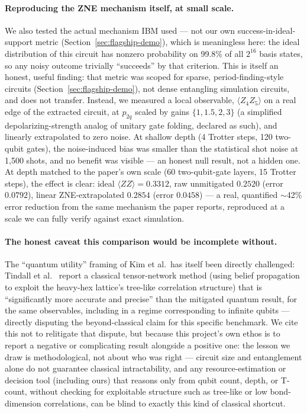 \documentclass[9pt,twocolumn]{extarticle}
\begin{document}
\paragraph{Reproducing the ZNE mechanism itself, at small scale.}
We also tested the actual mechanism IBM used --- not our own
success-in-ideal-support metric (Section~\ref{sec:flagship-demo}), which
is meaningless here: the ideal distribution of this circuit has nonzero
probability on 99.8\% of all $2^{16}$ basis states, so any noisy outcome
trivially ``succeeds'' by that criterion. This is itself an honest,
useful finding: that metric was scoped for sparse, period-finding-style
circuits (Section~\ref{sec:flagship-demo}), not dense entangling
simulation circuits, and does not transfer. Instead, we measured a local
observable, $\langle Z_4 Z_5\rangle$ on a real edge of the extracted
circuit, at $p_{2q}$ scaled by gains $\{1, 1.5, 2, 3\}$ (a simplified
depolarizing-strength analog of unitary gate folding, declared as such),
and linearly extrapolated to zero noise. At shallow depth (4 Trotter
steps, 120 two-qubit gates), the noise-induced bias was smaller than the
statistical shot noise at 1{,}500 shots, and no benefit was visible ---
an honest null result, not a hidden one. At depth matched to the paper's
own scale (60 two-qubit-gate layers, 15 Trotter steps), the effect is
clear: ideal $\langle ZZ\rangle=0.3312$, raw unmitigated
$0.2520$ (error $0.0792$), linear ZNE-extrapolated $0.2854$ (error
$0.0458$) --- a real, quantified $\sim$42\% error reduction from the same
mechanism the paper reports, reproduced at a scale we can fully verify
against exact simulation.

\paragraph{The honest caveat this comparison would be incomplete without.}
The ``quantum utility'' framing of Kim et al.\ has itself been directly
challenged: Tindall et al.\ \cite{tindall2023tensor} report a classical
tensor-network method (using belief propagation to exploit the heavy-hex
lattice's tree-like correlation structure) that is ``significantly more
accurate and precise'' than the mitigated quantum result, for the same
observables, including in a regime corresponding to infinite qubits ---
directly disputing the beyond-classical claim for this specific
benchmark. We cite this not to relitigate that dispute, but because this
project's own ethos is to report a negative or complicating result
alongside a positive one: the lesson we draw is methodological, not about
who was right --- circuit size and entanglement alone do not guarantee
classical intractability, and any resource-estimation or decision tool
(including ours) that reasons only from qubit count, depth, or T-count,
without checking for exploitable structure such as tree-like or low
bond-dimension correlations, can be blind to exactly this kind of
classical shortcut.
\end{document}
